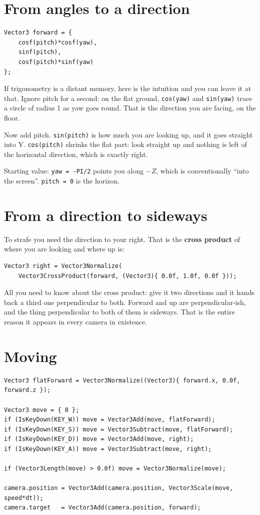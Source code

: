 \section{From angles to a direction}

\begin{lstlisting}
Vector3 forward = {
    cosf(pitch)*cosf(yaw),
    sinf(pitch),
    cosf(pitch)*sinf(yaw)
};
\end{lstlisting}

If trigonometry is a distant memory, here is the intuition and you can leave it
at that. Ignore pitch for a second: on the flat ground, \lstinline|cos(yaw)| and
\lstinline|sin(yaw)| trace a circle of radius 1 as yaw goes round. That is the
direction you are facing, on the floor.

Now add pitch. \lstinline|sin(pitch)| is how much you are looking up, and it goes
straight into Y. \lstinline|cos(pitch)| shrinks the flat part: look straight up
and nothing is left of the horizontal direction, which is exactly right.

Starting value: \lstinline|yaw = -PI/2| points you along $-Z$, which is
conventionally ``into the screen''. \lstinline|pitch = 0| is the horizon.

\section{From a direction to sideways}

To strafe you need the direction to your right. That is the \textbf{cross
product} of where you are looking and where up is:

\begin{lstlisting}
Vector3 right = Vector3Normalize(
    Vector3CrossProduct(forward, (Vector3){ 0.0f, 1.0f, 0.0f }));
\end{lstlisting}

All you need to know about the cross product: give it two directions and it hands
back a third one perpendicular to both. Forward and up are perpendicular-ish, and
the thing perpendicular to both of them is sideways. That is the entire reason it
appears in every camera in existence.

\section{Moving}

\begin{lstlisting}
Vector3 flatForward = Vector3Normalize((Vector3){ forward.x, 0.0f, forward.z });

Vector3 move = { 0 };
if (IsKeyDown(KEY_W)) move = Vector3Add(move, flatForward);
if (IsKeyDown(KEY_S)) move = Vector3Subtract(move, flatForward);
if (IsKeyDown(KEY_D)) move = Vector3Add(move, right);
if (IsKeyDown(KEY_A)) move = Vector3Subtract(move, right);

if (Vector3Length(move) > 0.0f) move = Vector3Normalize(move);

camera.position = Vector3Add(camera.position, Vector3Scale(move, speed*dt));
camera.target   = Vector3Add(camera.position, forward);
\end{lstlisting}

